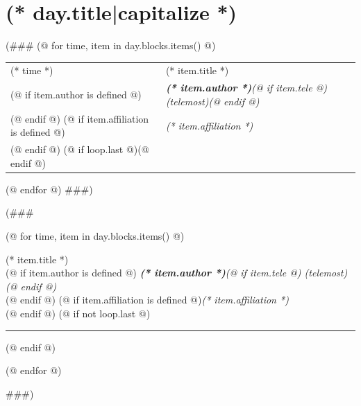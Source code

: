 \documentclass[a4paper]{report}
\begin{document}
        \section{(* day.title|capitalize *)}
(###
        (@ for time, item in day.blocks.items() @)
            \begin{tabularx}{\textwidth}{>{}p{2cm} >{\RaggedRight}X}
                \midrule
                {\Large (* time *)} & {\Large (* item.title *)} \\
                    (@ if item.author is defined @)
                        & \textit{\textbf{(* item.author *)}(@ if item.tele @) (telemost)(@ endif @)} \\
                    (@ endif @)
                    (@ if item.affiliation is defined @)
                        & \textit{(* item.affiliation *)} \\
                    (@ endif @)
                    (@ if loop.last @)\midrule(@ endif @)
            \end{tabularx}
        (@ endfor @)
###)

(###
        \begin{description}
            (@ for time, item in day.blocks.items() @)
                \item[(* time *)]
                    {\Large (* item.title *)} \\[1ex]
                    (@ if item.author is defined @)
                        \textit{\textbf{(* item.author *)}(@ if item.tele @) (telemost)(@ endif @)} \\%
                    (@ endif @)
                    (@ if item.affiliation is defined @)\textit{(* item.affiliation *)} \\[1ex](@ endif @)
                    (@ if not loop.last @)\rule{\paperwidth}{0.4pt}(@ endif @)

            (@ endfor @)
        \end{description}
###)
\end{document}
